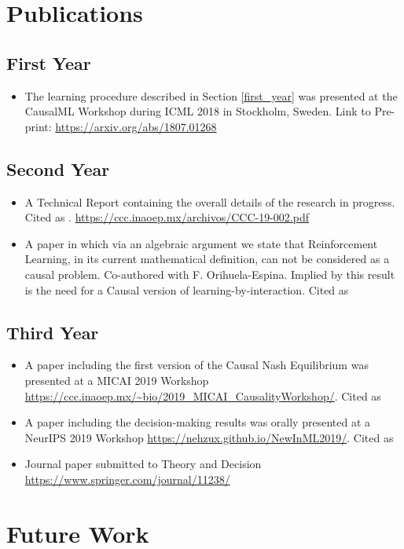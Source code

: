 \documentclass[english,letterpaper,12pt,final]{article}
\theoremstyle{definition}
\begin{document}
\section{Publications}
\subsection{First Year}
\begin{itemize}
\item The learning procedure described in Section \ref{first_year} was presented at the CausalML Workshop during ICML 2018 in Stockholm, Sweden. Link to Pre-print: \url{https://arxiv.org/abs/1807.01268}
\end{itemize}
\subsection{Second Year}
\begin{itemize}
\item A Technical Report containing the overall details of the research in progress. Cited as \cite{gonzalez2019causal}. \url{https://ccc.inaoep.mx/archivos/CCC-19-002.pdf}
\item A paper in which via an algebraic argument we state that Reinforcement Learning, in its current mathematical definition, can not be considered as a causal problem. Co-authored with F. Orihuela-Espina. Implied by this result is the need for a Causal version of learning-by-interaction. Cited as \cite{gonzalez2019reinforcement}
\end{itemize}
\subsection{Third Year}
\begin{itemize}
\item A paper including the first version of the Causal Nash Equilibrium was presented at a MICAI 2019 Workshop  \url{https://ccc.inaoep.mx/~bio/2019_MICAI_CausalityWorkshop/}. Cited as \cite{gonzalez2019games}
\item A paper including the decision-making results was orally presented at a NeurIPS 2019 Workshop  \url{https://nehzux.github.io/NewInML2019/}.  Cited as \cite{gonzalez2019theorems}
\item Journal paper submitted to Theory and Decision \url{https://www.springer.com/journal/11238/}
\end{itemize}

\section{Future Work}
\end{document}
